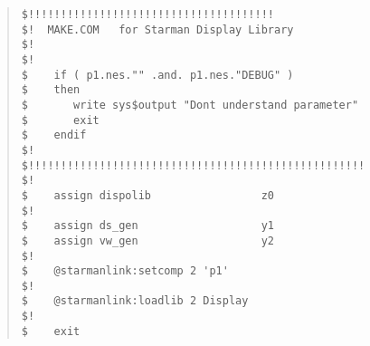 \begin{quote}
\begin{tabbing}
\verb#$!!!!!!!!!!!!!!!!!!!!!!!!!!!!!!!!!!!!!!                       #\\
\verb#$!  MAKE.COM   for Starman Display Library                    #\\
\verb#$!                                                            #\\
\verb#$!                                                            #\\
\verb#$    if ( p1.nes."" .and. p1.nes."DEBUG" )                    # \\
\verb#$    then                                                     #\\
\verb#$       write sys$output "Dont understand parameter"          #\\
\verb#$       exit                                                  #\\
\verb#$    endif                                                    #\\
\verb#$!                                                            #\\
\verb#$!!!!!!!!!!!!!!!!!!!!!!!!!!!!!!!!!!!!!!!!!!!!!!!!!!!!         #\\
\verb#$!                                                            #\\
\verb#$    assign dispolib                 z0                       # \\
\verb#$!                                                            #\\
\verb#$    assign ds_gen                   y1                       # \\
\verb#$    assign vw_gen                   y2                       # \\
\verb#$!                                                            #\\
\verb#$    @starmanlink:setcomp 2 'p1'                              # \\
\verb#$!                                                            #\\
\verb#$    @starmanlink:loadlib 2 Display                           # \\
\verb#$!                                                            #\\
\verb#$    exit                                                     #\\
\end{tabbing}
\end{quote}

